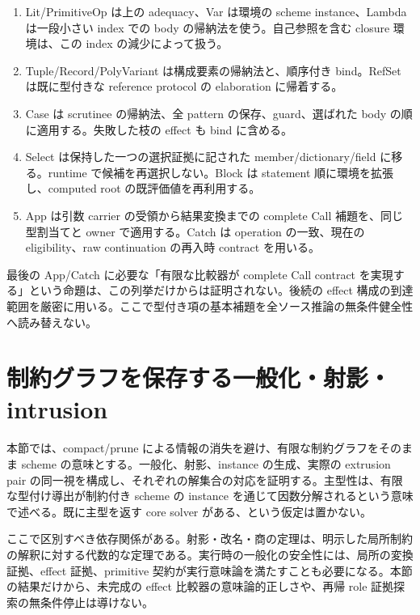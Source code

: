 \documentclass[11pt,a4paper]{article}
\theoremstyle{remark}
\begin{document}
\begin{enumerate}
\item Lit/PrimitiveOp は上の adequacy、Var は環境の scheme instance、Lambda は一段小さい index での body の帰納法を使う。自己参照を含む closure 環境は、この index の減少によって扱う。
\item Tuple/Record/PolyVariant は構成要素の帰納法と、順序付き bind。RefSet は既に型付きな reference protocol の elaboration に帰着する。
\item Case は scrutinee の帰納法、全 pattern の保存、guard、選ばれた body の順に適用する。失敗した枝の effect も bind に含める。
\item Select は保持した一つの選択証拠に記された member/dictionary/field に移る。runtime で候補を再選択しない。Block は statement 順に環境を拡張し、computed root の既評価値を再利用する。
\item App は引数 carrier の受領から結果変換までの complete Call 補題を、同じ型割当てと owner で適用する。Catch は operation の一致、現在の eligibility、raw continuation の再入時 contract を用いる。
\end{enumerate}

最後の App/Catch に必要な「有限な比較器が complete Call contract を実現する」という命題は、この列挙だけからは証明されない。後続の effect 構成の到達範囲を厳密に用いる。ここで型付き項の基本補題を全ソース推論の無条件健全性へ読み替えない。



\section{制約グラフを保存する一般化・射影・intrusion}
\label{sec:exact-graph-schemes}

本節では、compact/prune による情報の消失を避け、有限な制約グラフをそのまま scheme の意味とする。一般化、射影、instance の生成、実際の extrusion pair の同一視を構成し、それぞれの解集合の対応を証明する。主型性は、有限な型付け導出が制約付き scheme の instance を通じて因数分解されるという意味で述べる。既に主型を返す core solver がある、という仮定は置かない。

ここで区別すべき依存関係がある。射影・改名・商の定理は、明示した局所制約の解釈に対する代数的な定理である。実行時の一般化の安全性には、局所の変換証拠、effect 証拠、primitive 契約が実行意味論を満たすことも必要になる。本節の結果だけから、未完成の effect 比較器の意味論的正しさや、再帰 role 証拠探索の無条件停止は導けない。
\end{document}
